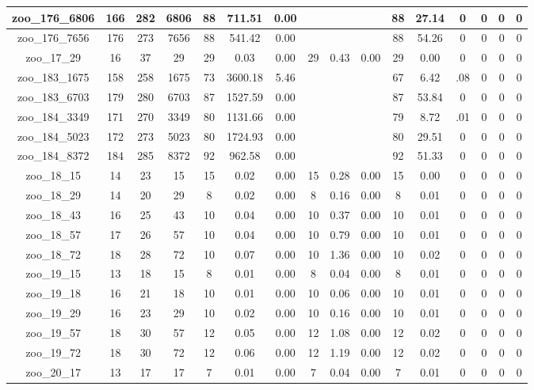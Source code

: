 \begin{landscape}
\begin{longtable}{|c|c|c|c|c|c|c|c|c|c|c|c|c|c|c|c|}
zoo\_176\_6806 & 166 & 282 & 6806 & 88 & 711.51 & 0.00 &  &  &  & 88 & 27.14 & 0 & 0 & 0 & 0 \\ \hline 
zoo\_176\_7656 & 176 & 273 & 7656 & 88 & 541.42 & 0.00 &  &  &  & 88 & 54.26 & 0 & 0 & 0 & 0 \\ \hline 
zoo\_17\_29 & 16 & 37 & 29 & 29 & 0.03 & 0.00 & 29 & 0.43 & 0.00 & 29 & 0.00 & 0 & 0 & 0 & 0 \\ \hline 
zoo\_183\_1675 & 158 & 258 & 1675 & 73 & 3600.18 & 5.46 &  &  &  & 67 & 6.42 & .08 & 0 & 0 & 0 \\ \hline 
zoo\_183\_6703 & 179 & 280 & 6703 & 87 & 1527.59 & 0.00 &  &  &  & 87 & 53.84 & 0 & 0 & 0 & 0 \\ \hline 
zoo\_184\_3349 & 171 & 270 & 3349 & 80 & 1131.66 & 0.00 &  &  &  & 79 & 8.72 & .01 & 0 & 0 & 0 \\ \hline 
zoo\_184\_5023 & 172 & 273 & 5023 & 80 & 1724.93 & 0.00 &  &  &  & 80 & 29.51 & 0 & 0 & 0 & 0 \\ \hline 
zoo\_184\_8372 & 184 & 285 & 8372 & 92 & 962.58 & 0.00 &  &  &  & 92 & 51.33 & 0 & 0 & 0 & 0 \\ \hline 
zoo\_18\_15 & 14 & 23 & 15 & 15 & 0.02 & 0.00 & 15 & 0.28 & 0.00 & 15 & 0.00 & 0 & 0 & 0 & 0 \\ \hline 
zoo\_18\_29 & 14 & 20 & 29 & 8 & 0.02 & 0.00 & 8 & 0.16 & 0.00 & 8 & 0.01 & 0 & 0 & 0 & 0 \\ \hline 
zoo\_18\_43 & 16 & 25 & 43 & 10 & 0.04 & 0.00 & 10 & 0.37 & 0.00 & 10 & 0.01 & 0 & 0 & 0 & 0 \\ \hline 
zoo\_18\_57 & 17 & 26 & 57 & 10 & 0.04 & 0.00 & 10 & 0.79 & 0.00 & 10 & 0.01 & 0 & 0 & 0 & 0 \\ \hline 
zoo\_18\_72 & 18 & 28 & 72 & 10 & 0.07 & 0.00 & 10 & 1.36 & 0.00 & 10 & 0.02 & 0 & 0 & 0 & 0 \\ \hline 
zoo\_19\_15 & 13 & 18 & 15 & 8 & 0.01 & 0.00 & 8 & 0.04 & 0.00 & 8 & 0.01 & 0 & 0 & 0 & 0 \\ \hline 
zoo\_19\_18 & 16 & 21 & 18 & 10 & 0.01 & 0.00 & 10 & 0.06 & 0.00 & 10 & 0.01 & 0 & 0 & 0 & 0 \\ \hline 
zoo\_19\_29 & 16 & 23 & 29 & 10 & 0.02 & 0.00 & 10 & 0.16 & 0.00 & 10 & 0.01 & 0 & 0 & 0 & 0 \\ \hline 
zoo\_19\_57 & 18 & 30 & 57 & 12 & 0.05 & 0.00 & 12 & 1.08 & 0.00 & 12 & 0.02 & 0 & 0 & 0 & 0 \\ \hline 
zoo\_19\_72 & 18 & 30 & 72 & 12 & 0.06 & 0.00 & 12 & 1.19 & 0.00 & 12 & 0.02 & 0 & 0 & 0 & 0 \\ \hline 
zoo\_20\_17 & 13 & 17 & 17 & 7 & 0.01 & 0.00 & 7 & 0.04 & 0.00 & 7 & 0.01 & 0 & 0 & 0 & 0 \\ \hline 

\end{longtable}
\end{landscape}
